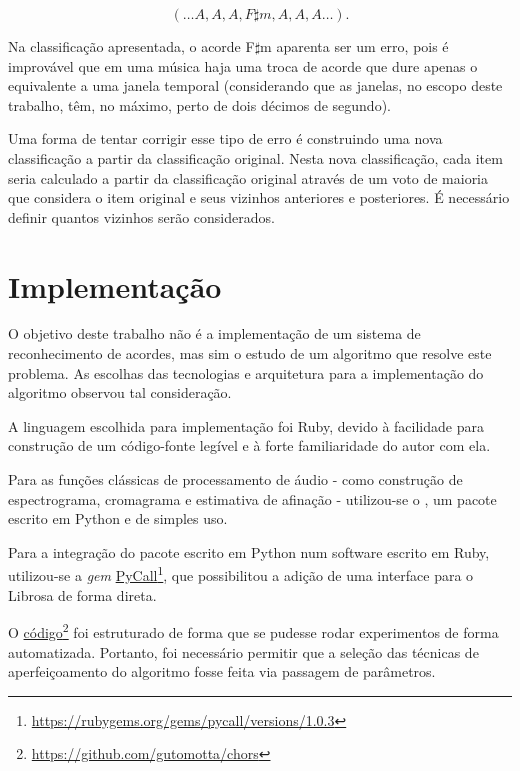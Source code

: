             \[
                (\dots A, A, A, F\sharp m, A, A, A \dots)\mbox{.}
            \]

        Na classificação apresentada, o acorde F$\sharp$m aparenta ser um erro, pois é improvável que em uma música haja uma troca de acorde que dure apenas o equivalente a uma janela temporal (considerando que as janelas, no escopo deste trabalho, têm, no máximo, perto de dois décimos de segundo).
        
        Uma forma de tentar corrigir esse tipo de erro é construindo uma nova classificação a partir da classificação original. Nesta nova classificação, cada item seria calculado a partir da classificação original através de um voto de maioria que considera o item original e seus vizinhos anteriores e posteriores. É necessário definir quantos vizinhos serão considerados.

\section{Implementação}
\label{sec:implementacao} 
    O objetivo deste trabalho não é a implementação de um sistema de reconhecimento de acordes, mas sim o estudo de um algoritmo que resolve este problema. As escolhas das tecnologias e arquitetura para a implementação do algoritmo observou tal consideração.
    
    A linguagem escolhida para implementação foi Ruby, devido à facilidade para construção de um código-fonte legível e à forte familiaridade do autor com ela.
    
    Para as funções clássicas de processamento de áudio - como construção de espectrograma, cromagrama e estimativa de afinação - utilizou-se o \cite{librosa}, um pacote escrito em Python e de simples uso.

    Para a integração do pacote escrito em Python num software escrito em Ruby, utilizou-se a \textit{gem} \href{https://rubygems.org/gems/pycall/versions/1.0.3}{PyCall}\footnote{\url{https://rubygems.org/gems/pycall/versions/1.0.3}}, que possibilitou a adição de uma interface para o Librosa de forma direta.
    
    O \href{https://github.com/gutomotta/chors}{código}\footnote{\url{https://github.com/gutomotta/chors}} foi estruturado de forma que se pudesse rodar experimentos de forma automatizada. Portanto, foi necessário permitir que a seleção das técnicas de aperfeiçoamento do algoritmo fosse feita via passagem de parâmetros.
    
